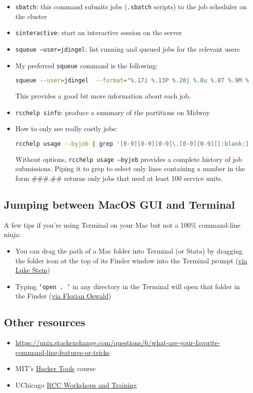 \begin{itemize}
	\item \texttt{sbatch}: this command submits jobs (\texttt{.sbatch} scripts) to the job scheduler on the cluster
	\item \texttt{sinteractive}: start an interactive session on the server
	\item \texttt{squeue --user=jdingel}: list running and queued jobs for the relevant users
	\item My preferred \texttt{squeue} command is the following:
	\begin{lstlisting}[language=bash]
	squeue --user=jdingel  --format="%.17i %.13P %.20j %.8u %.8T %.9M %.9l %.6D %R" #jdjobs
	\end{lstlisting}
	This provides a good bit more information about each job.
	\item \texttt{rcchelp sinfo}: produce a summary of the partitions on Midway
	\item How to only see really costly jobs: 
	\begin{lstlisting}[language=bash]
	rcchelp usage --byjob | grep '[0-9][0-9][0-9]\.[0-9][0-9][[:blank:]]|'
	\end{lstlisting}
	Without options, \texttt{rcchelp usage --byjob} provides a complete history of job submissions.
	Piping it to grep to select only lines containing a number in the form \#\#\#.\#\# returns only jobs that used at least 100 service units.
\end{itemize}

\subsection{Jumping between MacOS GUI and Terminal}

A few tips if you're using Terminal on your Mac but not a 100\% command-line ninja:
\begin{itemize}
	\item You can drag the path of a Mac folder into Terminal (or Stata) by dragging the folder icon at the top of its Finder window into the Terminal prompt (\href{https://twitter.com/lukestein/status/1179792864630296578}{via Luke Stein})
	\item Typing \texttt{`open . `} in any directory in the Terminal will open that folder in the Finder (\href{https://twitter.com/FlorianOswald/status/1179779138892292096}{via Florian Oswald})
\end{itemize}

\subsection{Other resources}

\begin{itemize}
	\item \url{https://unix.stackexchange.com/questions/6/what-are-your-favorite-command-line-features-or-tricks}
	\item MIT's \href{https://hacker-tools.github.io/}{Hacker Tools} course
	\item UChicago \href{https://rcc.uchicago.edu/support-and-services/workshops-and-training}{RCC Workshops and Training}
\end{itemize}